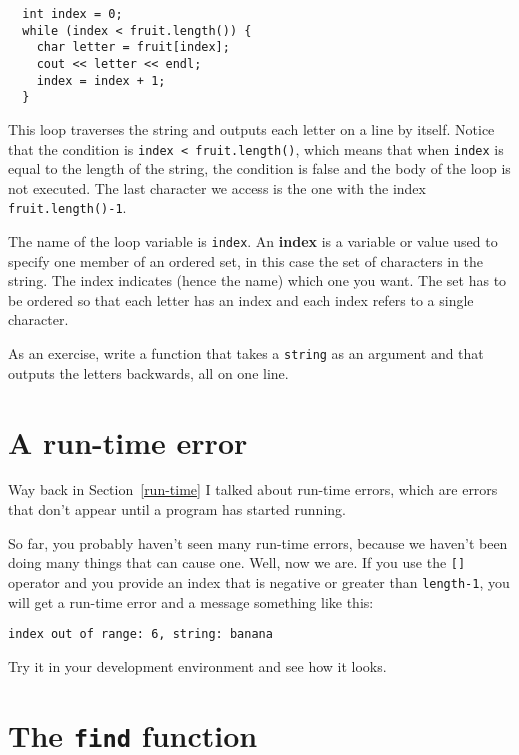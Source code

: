 \begin{verbatim}
  int index = 0;
  while (index < fruit.length()) {
    char letter = fruit[index];
    cout << letter << endl;
    index = index + 1;
  }
\end{verbatim}
%
This loop traverses the string and outputs each letter on
a line by itself.  Notice that the condition is
{\tt index < fruit.length()}, which means that when
{\tt index} is equal to the length of the string, the
condition is false and the body of the loop is not executed.
The last character we access is the one with the
index {\tt fruit.length()-1}.


The name of the loop variable is {\tt index}.  An {\bf
index} is a variable or value used to specify one member of an ordered
set, in this case the set of characters in the string.  The index
indicates (hence the name) which one you want.  The set has to be
ordered so that each letter has an index and each index
refers to a single character.

As an exercise, write a function that takes a {\tt string}
as an argument and that outputs the letters backwards, all on
one line.

\section{A run-time error}

Way back in Section~\ref{run-time} I talked about run-time errors,
which are errors that don't appear until a program has started
running.

So far, you probably haven't seen many run-time errors, because we
haven't been doing many things that can cause one.  Well, now we are.
If you use the {\tt []} operator and you provide an index that is
negative or greater than {\tt length-1}, you will get a run-time
error and a message something like this:

\begin{verbatim}
index out of range: 6, string: banana
\end{verbatim}
%
Try it in your development environment and see how it looks.

\section{The {\tt find} function}


